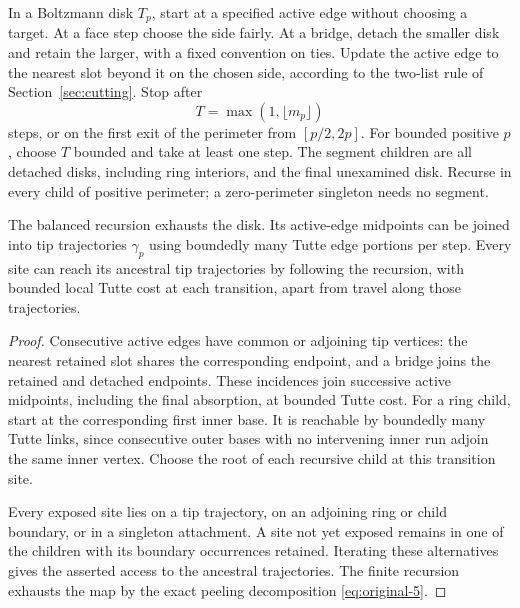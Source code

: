 \begin{definition}\label{end:balanced-segment}

In a Boltzmann disk $T_p$, start at a specified active edge without
choosing a target. At a face step choose the side fairly. At a bridge,
detach the smaller disk and retain the larger, with a fixed convention on
ties. Update the active edge to the nearest slot beyond it on the chosen
side, according to the two-list rule of Section~\ref{sec:cutting}.
Stop after
\[
 T=\max(1,\lfloor m_p\rfloor)
\]
steps, or on the first exit of the perimeter from $[p/2,2p]$.
For bounded positive $p$, choose $T$ bounded and take at least one step.
The segment children are all detached disks, including ring interiors,
and the final unexamined disk. Recurse in every child of positive perimeter;
a zero-perimeter singleton needs no segment.

\end{definition}

\begin{lemma}\label{end:tip-access}
The balanced recursion exhausts the disk. Its active-edge midpoints can be
joined into tip trajectories $\gamma_p$ using boundedly many Tutte edge
portions per step. Every site can reach its ancestral tip trajectories by
following the recursion, with bounded local Tutte cost at each transition,
apart from travel along those trajectories.
\end{lemma}

\begin{proof}
Consecutive active edges have common or adjoining tip vertices: the nearest
retained slot shares the corresponding endpoint, and a bridge joins the
retained and detached endpoints. These incidences join successive active
midpoints, including the final absorption, at bounded Tutte cost.
For a ring child, start at the corresponding first inner base. It is
reachable by boundedly many Tutte links, since consecutive outer bases with
no intervening inner run adjoin the same inner vertex. Choose the root of
each recursive child at this transition site.

Every exposed site lies on a tip trajectory, on an adjoining ring or child
boundary, or in a singleton attachment. A site not yet exposed remains in
one of the children with its boundary occurrences retained. Iterating these
alternatives gives the asserted access to the ancestral trajectories.
The finite recursion exhausts the map by the exact peeling decomposition
\eqref{eq:original-5}.
\end{proof}

